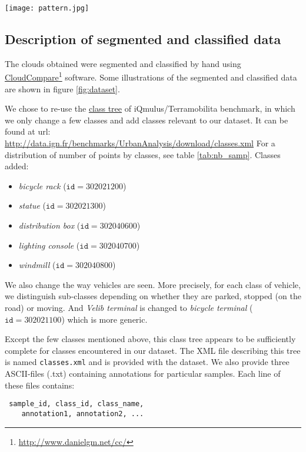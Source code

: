 \documentclass[a4paper, 10pt, journal]{article}
\begin{document}
\begin{center}\centering
 \texttt{[image: pattern.jpg]}
\end{center}

\subsection{Description of segmented and classified data} \label{subsec:description_data}

The clouds obtained were segmented and classified by hand using \href{http://www.danielgm.net/cc/}{CloudCompare}\footnote{\url{http://www.danielgm.net/cc/}} software. Some illustrations of the segmented and classified data are shown in figure \ref{fig:dataset}.

We chose to re-use the \href{http://data.ign.fr/benchmarks/UrbanAnalysis/download/classes.xml}{class tree} %
 of iQmulus/Terramobilita benchmark, in which we only change a few classes and add classes relevant to our dataset. It can be found at url: \url{http://data.ign.fr/benchmarks/UrbanAnalysis/download/classes.xml}
For a distribution of number of points by classes, see table \ref{tab:nb_samp}.
Classes added:
\begin{itemize}
 \item \textit{bicycle rack} ($\mathtt{id} = 302021200$)
 \item \textit{statue} ($\mathtt{id} = 302021300$)
 \item \textit{distribution box} ($\mathtt{id} = 302040600$)
 \item \textit{lighting console} ($\mathtt{id} = 302040700$)
 \item \textit{windmill} ($\mathtt{id} = 302040800$)
\end{itemize}
We also change the way vehicles are seen. More precisely, for each class of vehicle, we distinguish sub-classes depending on whether they are parked, stopped (on the road) or moving.
And \textit{Velib terminal} is changed to \textit{bicycle terminal} ($\mathtt{id} = 302021100$) which is more generic.

Except the few classes mentioned above, this class tree appears to be sufficiently complete for classes encountered in our dataset. The XML file describing this tree is named \texttt{classes.xml} and is provided with the dataset. We also provide three ASCII-files (.txt) containing annotations for particular samples. Each line of these files contains: 
\begin{verbatim}
 sample_id, class_id, class_name,
    annotation1, annotation2, ...
\end{verbatim}
\end{document}
